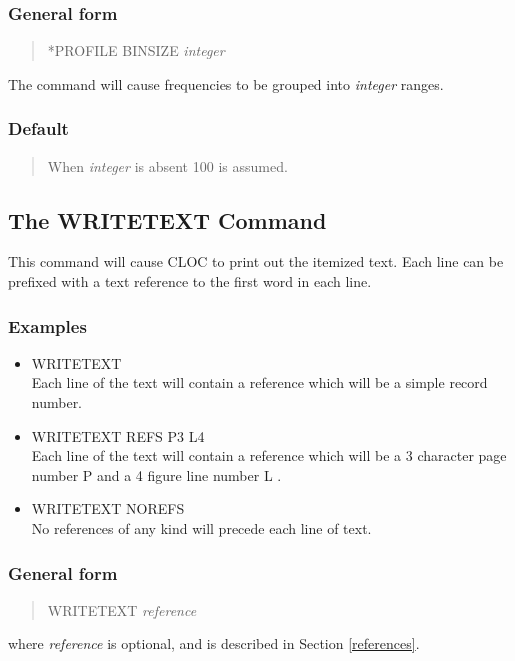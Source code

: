 \subsubsection{General form}
\begin{quote}
*PROFILE        BINSIZE {\em integer}
\end{quote}
The command will cause frequencies to be grouped into {\em integer} ranges.

\subsubsection{Default}
\begin{quote}
When {\em integer} is absent 100 is assumed.
\end{quote}

\subsection{The WRITETEXT Command}
This command will cause CLOC to print out the itemized text. Each line
can be prefixed with a text reference to the first word in each line.

\subsubsection{Examples}
\begin{itemize}
\item WRITETEXT\\
Each line of the text will contain a reference which will be a
simple record number.

\item WRITETEXT         REFS P3 L4\\
Each line of the text will contain a reference which will be a 3 character
page number P and a 4 figure line number L .
\item WRITETEXT         NOREFS\\
No references of any kind will precede each line of text.
\end{itemize}

\subsubsection{General form}
\begin{quote}
WRITETEXT      {\em reference}
\end{quote}
where {\em reference} is optional, and is described in Section \ref{references}.

